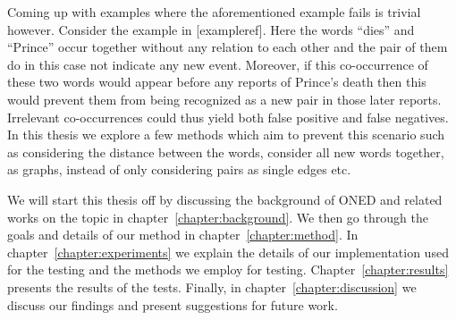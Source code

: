 Coming up with examples where the aforementioned example fails is trivial however. Consider the example in [exampleref]. Here the words ``dies'' and ``Prince'' occur together without any relation to each other and the pair of them do in this case not indicate any new event. Moreover, if this co-occurrence of these two words would appear before any reports of Prince's death then this would prevent them from being recognized as a new pair in those later reports. Irrelevant co-occurrences could thus yield both false positive and false negatives. In this thesis we explore a few methods which aim to prevent this scenario such as considering the distance between the words, consider all new words together, as graphs, instead of only considering pairs as single edges etc.

We will start this thesis off by discussing the background of ONED and related works on the topic in chapter~\ref{chapter:background}. We then go through the goals and details of our method in chapter~\ref{chapter:method}. In chapter~\ref{chapter:experiments} we explain the details of our implementation used for the testing and the methods we employ for testing. Chapter~\ref{chapter:results} presents the results of the tests. Finally, in chapter~\ref{chapter:discussion} we discuss our findings and present suggestions for future work.
